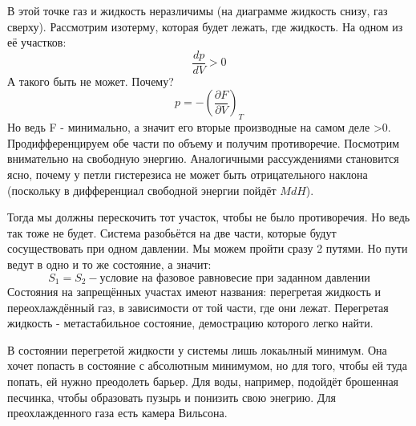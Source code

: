 \documentclass[a4paper, 12pt]{article}
\begin{document}
	В этой точке газ и жидкость неразличимы (на диаграмме жидкость снизу, газ сверху).  Рассмотрим изотерму, которая будет лежать, где жидкость. На одном из её участков:
	\begin{equation*}
		\frac{dp}{dV} > 0 
	\end{equation*}
	А такого быть не может. Почему? 
	\begin{equation*}	
		p = -(\frac{\partial F}{\partial V})_{T}
	\end{equation*}
	Но ведь F - минимально, а значит его вторые производные на самом деле >0. Продифференцируем обе части по объему и получим противоречие. Посмотрим внимательно на свободную энергию. Аналогичными рассуждениями становится ясно, почему у петли гистерезиса не может быть отрицательного наклона (поскольку в дифференциал свободной энергии пойдёт $MdH$).
	
	Тогда мы должны перескочить тот участок, чтобы не было противоречия. Но ведь так тоже не будет. Система разобьётся на две части, которые будут сосуществовать при одном давлении. Мы можем пройти сразу 2 путями. Но пути ведут в одно и то же состояние, а значит:
	\begin{equation*}
		S_{1} = S_{2} - \text{условие на фазовое равновесие при заданном давлении}
	\end{equation*}
	Состояния на запрещённых участах имеют названия: перегретая жидкость и переохлаждённый газ, в зависимости от той части, где они лежат. Перегретая жидкость - метастабильное состояние, демострацию которого легко найти.
	
	В состоянии перегретой жидкости у системы лишь локаьлный минимум. Она хочет попасть в состояние с абсолютным минимумом, но для того, чтобы ей туда попать, ей нужно преодолеть барьер. Для воды, например, подойдёт брошенная песчинка, чтобы образовать пузырь и понизить свою энегрию. Для преохлажденного газа есть камера Вильсона.
\end{document}
